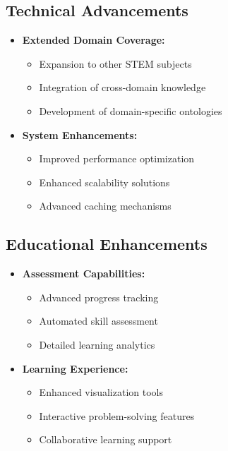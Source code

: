 \subsection{Technical Advancements}
\begin{itemize}
    \item \textbf{Extended Domain Coverage:} 
        \begin{itemize}
            \item Expansion to other STEM subjects
            \item Integration of cross-domain knowledge
            \item Development of domain-specific ontologies
        \end{itemize}
    
    \item \textbf{System Enhancements:}
        \begin{itemize}
            \item Improved performance optimization
            \item Enhanced scalability solutions
            \item Advanced caching mechanisms
        \end{itemize}
\end{itemize}

\subsection{Educational Enhancements}
\begin{itemize}
    \item \textbf{Assessment Capabilities:}
        \begin{itemize}
            \item Advanced progress tracking
            \item Automated skill assessment
            \item Detailed learning analytics
        \end{itemize}
    
    \item \textbf{Learning Experience:}
        \begin{itemize}
            \item Enhanced visualization tools
            \item Interactive problem-solving features
            \item Collaborative learning support
        \end{itemize}
\end{itemize}

